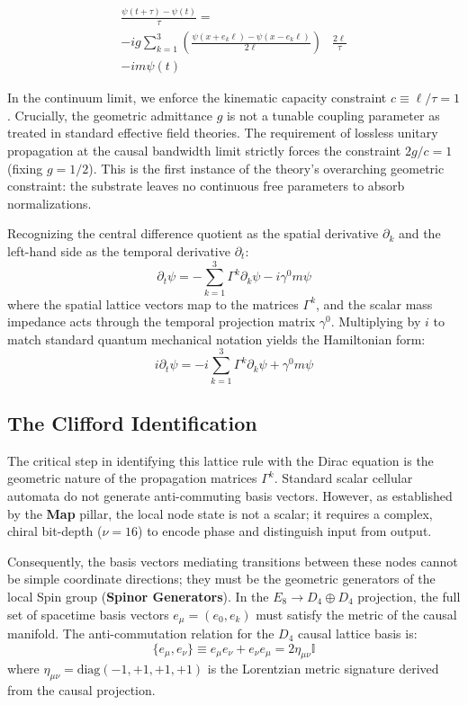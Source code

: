 \begin{equation}
\begin{split}
    \frac{\psi(t+\tau) - \psi(t)}{\tau} =& \\ 
    -i g \sum_{k=1}^{3} \left( \frac{\psi(x + e_k \ell) - \psi(x - e_k \ell)}{2\ell} \right) &\frac{2\ell}{\tau} \\
    - i m \psi(t)&
    \end{split}
\end{equation}

In the continuum limit, we enforce the kinematic capacity constraint $c \equiv \ell/\tau = 1$. Crucially, the geometric admittance $g$ is not a tunable coupling parameter as treated in standard effective field theories. The requirement of lossless unitary propagation at the causal bandwidth limit strictly forces the constraint $2g/c = 1$ (fixing $g=1/2$). This is the first instance of the theory's overarching geometric constraint: the substrate leaves no continuous free parameters to absorb normalizations.

Recognizing the central difference quotient as the spatial derivative $\partial_k$ and the left-hand side as the temporal derivative $\partial_t$:
\begin{equation}
    \partial_t \psi = - \sum_{k=1}^{3} \Gamma^k \partial_k \psi - i \gamma^0 m \psi
\end{equation}
where the spatial lattice vectors map to the matrices $\Gamma^k$, and the scalar mass impedance acts through the temporal projection matrix $\gamma^0$. Multiplying by $i$ to match standard quantum mechanical notation yields the Hamiltonian form:
\begin{equation}
    i \partial_t \psi = -i \sum_{k=1}^{3} \Gamma^k \partial_k \psi + \gamma^0 m \psi
\end{equation}

\subsection{The Clifford Identification}
The critical step in identifying this lattice rule with the Dirac equation is the geometric nature of the propagation matrices $\Gamma^k$. Standard scalar cellular automata do not generate anti-commuting basis vectors. However, as established by the \textbf{Map} pillar, the local node state is not a scalar; it requires a complex, chiral bit-depth ($\nu=16$) to encode phase and distinguish input from output. 

Consequently, the basis vectors mediating transitions between these nodes cannot be simple coordinate directions; they must be the geometric generators of the local Spin group (\textbf{Spinor Generators}). In the $E_8 \to D_4 \oplus D_4$ projection, the full set of spacetime basis vectors $e_\mu = (e_0, e_k)$ must satisfy the metric of the causal manifold. The anti-commutation relation for the $D_4$ causal lattice basis is:
\begin{equation}
    \{e_\mu, e_\nu\} \equiv e_\mu e_\nu + e_\nu e_\mu = 2\eta_{\mu\nu} \mathbb{I}
\end{equation}
where $\eta_{\mu\nu} = \text{diag}(-1,+1,+1,+1)$ is the Lorentzian metric signature derived from the causal projection.

